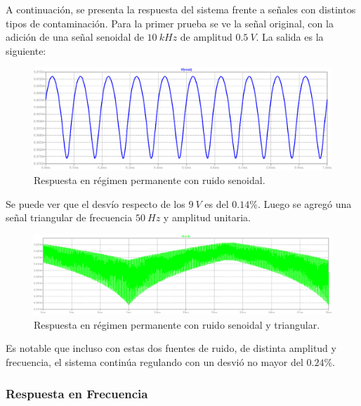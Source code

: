 A continuación, se presenta la respuesta del sistema frente a señales con distintos tipos de contaminación. Para la primer prueba se ve la señal original, con la adición de una señal senoidal de $10 \ kHz$ de amplitud $0.5 \ V$. La salida es la siguiente:
\begin{figure}[H]
\centering
	\includegraphics[width=1\textwidth]{ImagenesEjercicio2/permrespsine.png}
	\caption{Respuesta en régimen permanente con ruido senoidal.}
	\label{fig:permanenteFuentesine}
\end{figure}

Se puede ver que el desvío respecto de los $9 \ V$ es del $0.14\%$. Luego se agregó una señal triangular de frecuencia $50 \ Hz$ y amplitud unitaria.
\begin{figure}[H]
\centering
	\includegraphics[width=1\textwidth]{ImagenesEjercicio2/permrespsinetri.png}
	\caption{Respuesta en régimen permanente con ruido senoidal y triangular.}
	\label{fig:permanenteFuentesinetri}
\end{figure}

Es notable que incluso con estas dos fuentes de ruido, de distinta amplitud y frecuencia, el sistema continúa regulando con un desvió no mayor del $0.24\%$.

\subsubsection{Respuesta en Frecuencia}

